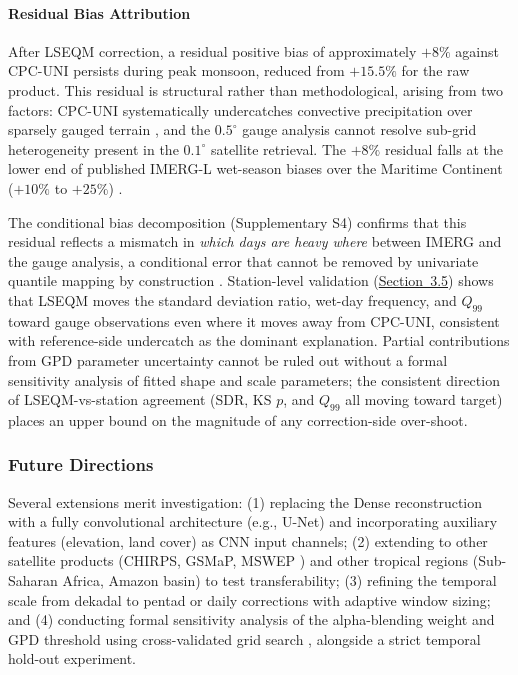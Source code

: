 \documentclass[11pt,a4paper]{article}
\begin{document}
\paragraph{Residual Bias Attribution}\label{residual-bias-attribution}

After LSEQM correction, a residual positive bias of approximately \(+8\%\) against CPC-UNI persists during peak monsoon, reduced from \(+15.5\%\) for the raw product. This residual is structural rather than methodological, arising from two factors: CPC-UNI systematically undercatches convective precipitation over sparsely gauged terrain \cite{ref36,ref37}, and the \(0.5^{\circ}\) gauge analysis cannot resolve sub-grid heterogeneity present in the \(0.1^{\circ}\) satellite retrieval. The \(+8\%\) residual falls at the lower end of published IMERG-L wet-season biases over the Maritime Continent (\(+10\%\) to \(+25\%\)) \cite{ref31,ref32,ref33,ref38,ref39,ref47}.

The conditional bias decomposition (Supplementary S4) confirms that this residual reflects a mismatch in \emph{which days are heavy where} between IMERG and the gauge analysis, a conditional error that cannot be removed by univariate quantile mapping by construction \cite{ref34,ref11}. Station-level validation (\hyperref[station-level-ground-truth-validation]{Section~3.5}) shows that LSEQM moves the standard deviation ratio, wet-day frequency, and \(Q_{99}\) toward gauge observations even where it moves away from CPC-UNI, consistent with reference-side undercatch as the dominant explanation. Partial contributions from GPD parameter uncertainty cannot be ruled out without a formal sensitivity analysis of fitted shape and scale parameters; the consistent direction of LSEQM-vs-station agreement (SDR, KS \(p\), and \(Q_{99}\) all moving toward target) places an upper bound on the magnitude of any correction-side over-shoot.

\subsubsection{Future Directions}\label{future-directions}

Several extensions merit investigation: (1) replacing the Dense reconstruction with a fully convolutional architecture (e.g., U-Net) and incorporating auxiliary features (elevation, land cover) as CNN input channels; (2) extending to other satellite products (CHIRPS, GSMaP, MSWEP \cite{ref42}) and other tropical regions (Sub-Saharan Africa, Amazon basin) to test transferability; (3) refining the temporal scale from dekadal to pentad or daily corrections with adaptive window sizing; and (4) conducting formal sensitivity analysis of the alpha-blending weight and GPD threshold using cross-validated grid search \cite{ref43}, alongside a strict temporal hold-out experiment.
\end{document}
